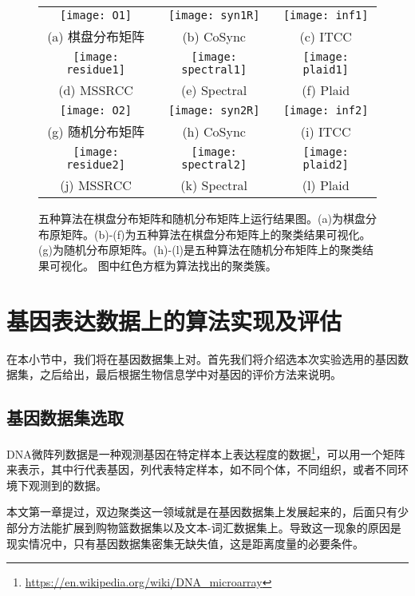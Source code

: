 \tabcolsep=1pt
\begin{figure*}[!p]
\centering
\begin{tabular}{ccc}
\texttt{[image: O1]}&
\texttt{[image: syn1R]}&
\texttt{[image: inf1]}\\
(a) 棋盘分布矩阵  & (b) CoSync &  (c) ITCC\\
\texttt{[image: residue1]}&
\texttt{[image: spectral1]}&
\texttt{[image: plaid1]}\\
(d) MSSRCC &  (e)  Spectral &  (f) Plaid\\
\texttt{[image: O2]}&
\texttt{[image: syn2R]}&
\texttt{[image: inf2]}\\
(g) 随机分布矩阵  & (h) CoSync &  (i) ITCC\\
\texttt{[image: residue2]}&
\texttt{[image: spectral2]}&
\texttt{[image: plaid2]}\\
(j) MSSRCC &  (k)  Spectral &  (l) Plaid
\end{tabular}
\caption{五种算法在棋盘分布矩阵和随机分布矩阵上运行结果图。(a)为棋盘分布原矩阵。(b)-(f)为五种算法在棋盘分布矩阵上的聚类结果可视化。(g)为随机分布原矩阵。(h)-(l)是五种算法在随机分布矩阵上的聚类结果可视化。
图中红色方框为算法找出的聚类簇。}
\label{fig:yiqi_r}
\end{figure*}



\section{基因表达数据上的算法实现及评估}
\label{sec:gene}
在本小节中，我们将在基因数据集上对。首先我们将介绍选本次实验选用的基因数据集，之后给出，最后根据生物信息学中对基因的评价方法来说明。

\subsection{基因数据集选取}
DNA微阵列数据是一种观测基因在特定样本上表达程度的数据\footnote{\url{https://en.wikipedia.org/wiki/DNA_microarray}}，可以用一个矩阵来表示，其中行代表基因，列代表特定样本，如不同个体，不同组织，或者不同环境下观测到的数据。

本文第一章提过，双边聚类这一领域就是在基因数据集上发展起来的，后面只有少部分方法能扩展到购物篮数据集以及文本-词汇数据集上。导致这一现象的原因是现实情况中，只有基因数据集密集无缺失值，这是距离度量的必要条件。

